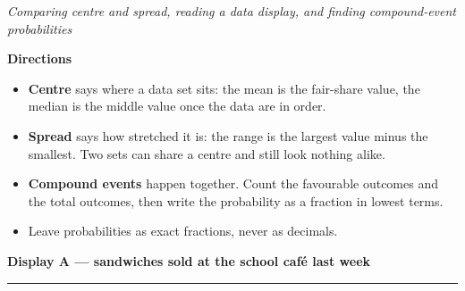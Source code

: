 \documentclass[12pt]{article}
\begin{document}

\begin{center}
\textit{Comparing centre and spread, reading a data display, and finding compound-event
probabilities}
\end{center}

\noindent\textbf{Directions}
\begin{itemize}[leftmargin=0.9cm, itemsep=1pt, topsep=2pt]
  \item \textbf{Centre} says where a data set sits: the mean is the fair-share value, the
        median is the middle value once the data are in order.
  \item \textbf{Spread} says how stretched it is: the range is the largest value minus the
        smallest. Two sets can share a centre and still look nothing alike.
  \item \textbf{Compound events} happen together. Count the favourable outcomes and the
        total outcomes, then write the probability as a fraction in lowest terms.
  \item Leave probabilities as exact fractions, never as decimals.
\end{itemize}

\vspace{0.2cm}
\noindent\textbf{Display A --- sandwiches sold at the school caf\'e last week}
\par{}

\begin{center}
\end{center}

\vspace{0.1cm}
\noindent\rule{\linewidth}{0.4pt}

\vspace{0.15cm}
\end{document}
